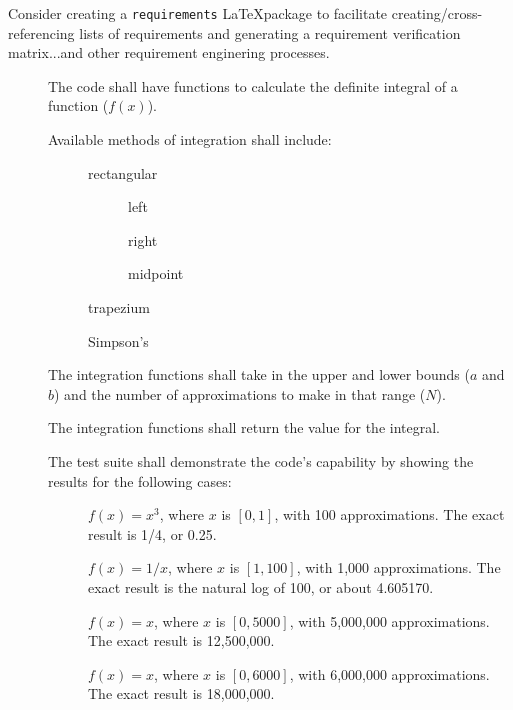 \label{Functional_Requirements}

\begin{future}
Consider creating a \lstinline{requirements} \LaTeX package to facilitate creating/cross-referencing 
lists of requirements and generating a requirement verification matrix...and other requirement enginering processes.
\end{future}

\begin{description}
  \item[] The code shall have functions to calculate the definite integral of a function ($f(x)$).
  \item[] Available methods of integration shall include:
  \begin{description}
    \item[] rectangular
      \begin{description}
        \item[] left
        \item[] right
        \item[] midpoint
      \end{description}
    \item[] trapezium
    \item[] Simpson's 
  \end{description}
  \item[] The integration functions shall take in the upper and lower bounds ($a$ and $b$) and the number of 
approximations to make in that range ($N$). 
  \item[] The integration functions shall return the value for the integral.
  \item[] The test suite shall demonstrate the code's capability by showing the results for the following cases:
  \begin{description}
    \item[]
    $f(x) = x^3$, where $x$ is $[0,1]$, with 100 approximations. The exact result is 1/4, or 0.25.
    \item[]
    $f(x) = 1/x$, where $x$ is $[1,100]$, with 1,000 approximations. The exact result is the natural log of 100, or about 4.605170.
    \item[]
    $f(x) = x$, where $x$ is $[0,5000]$, with 5,000,000 approximations. The exact result is 12,500,000.
    \item[]
    $f(x) = x$, where $x$ is $[0,6000]$, with 6,000,000 approximations. The exact result is 18,000,000.
  \end{description}
\end{description}
